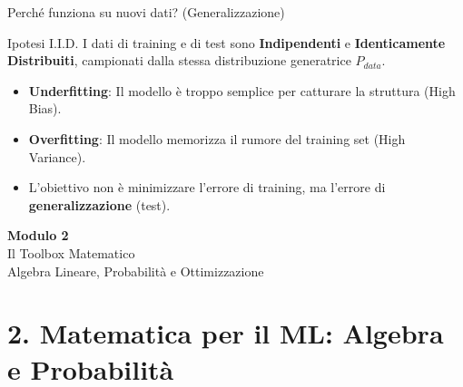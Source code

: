 \documentclass[aspectratio=169, 10pt]{beamer}
\begin{document}
\begin{frame}{Perché funziona su nuovi dati? (Generalizzazione)}
    \begin{alertblock}{Ipotesi I.I.D.}
        I dati di training e di test sono \textbf{Indipendenti} e \textbf{Identicamente Distribuiti}, campionati dalla stessa distribuzione generatrice $P_{data}$.
    \end{alertblock}
    
    \begin{itemize}
        \item \textbf{Underfitting}: Il modello è troppo semplice per catturare la struttura (High Bias).
        \item \textbf{Overfitting}: Il modello memorizza il rumore del training set (High Variance).
        \item L'obiettivo non è minimizzare l'errore di training, ma l'errore di \textbf{generalizzazione} (test).
    \end{itemize}
\end{frame}


\begin{frame}[plain]
    \centering
    \vspace{2cm}
    {\Huge \textbf{Modulo 2}}\\[0.5cm]
    {\Huge \textcolor{Accent}{Il Toolbox Matematico}}\\[1cm]
    {\large Algebra Lineare, Probabilità e Ottimizzazione}
\end{frame}

\section{2. Matematica per il ML: Algebra e Probabilità}
\end{document}
